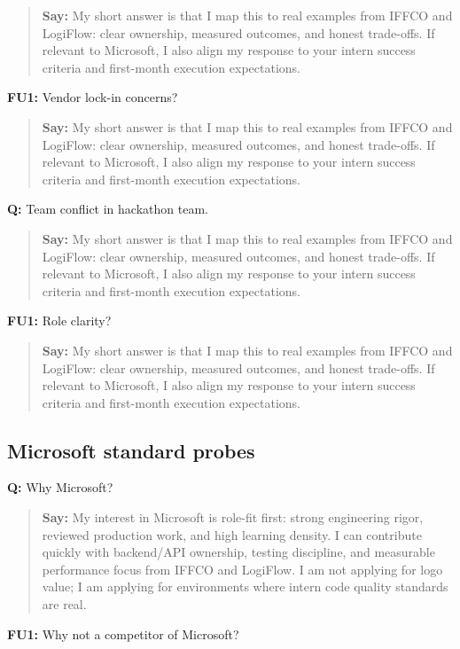 \documentclass[9pt,a4paper]{article}
\begin{document}
\begin{quote}\small\textbf{Say:} My short answer is that I map this to real examples from IFFCO and LogiFlow: clear ownership, measured outcomes, and honest trade-offs. If relevant to Microsoft, I also align my response to your intern success criteria and first-month execution expectations.\end{quote}
\vspace{2mm}
\textbf{FU1:} Vendor lock-in concerns?

\begin{quote}\small\textbf{Say:} My short answer is that I map this to real examples from IFFCO and LogiFlow: clear ownership, measured outcomes, and honest trade-offs. If relevant to Microsoft, I also align my response to your intern success criteria and first-month execution expectations.\end{quote}
\vspace{2mm}
\textbf{Q:} Team conflict in hackathon team.

\begin{quote}\small\textbf{Say:} My short answer is that I map this to real examples from IFFCO and LogiFlow: clear ownership, measured outcomes, and honest trade-offs. If relevant to Microsoft, I also align my response to your intern success criteria and first-month execution expectations.\end{quote}
\vspace{2mm}
\textbf{FU1:} Role clarity?

\begin{quote}\small\textbf{Say:} My short answer is that I map this to real examples from IFFCO and LogiFlow: clear ownership, measured outcomes, and honest trade-offs. If relevant to Microsoft, I also align my response to your intern success criteria and first-month execution expectations.\end{quote}
\vspace{2mm}
\subsection{Microsoft standard probes}
\textbf{Q:} Why Microsoft?

\begin{quote}\small\textbf{Say:} My interest in Microsoft is role-fit first: strong engineering rigor, reviewed production work, and high learning density. I can contribute quickly with backend/API ownership, testing discipline, and measurable performance focus from IFFCO and LogiFlow. I am not applying for logo value; I am applying for environments where intern code quality standards are real.\end{quote}
\vspace{2mm}
\textbf{FU1:} Why not a competitor of Microsoft?
\end{document}
